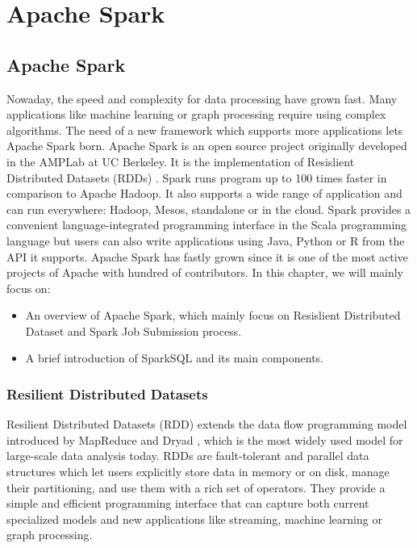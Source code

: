 
\chapter{Apache Spark} %

\label{Chapter2} %



\section{Apache Spark}
Nowaday, the speed and complexity for data processing have grown fast. Many applications like machine learning or graph processing require using complex algorithms. The need of a new framework which supports more applications lets Apache Spark born. Apache Spark is an open source project originally developed in the AMPLab at UC Berkeley. It is the implementation of Resislient Distributed Datasets (RDDs) \cite{matei}. Spark runs program up to 100 times faster in comparison to Apache Hadoop. It also supports a wide range of application and can run everywhere: Hadoop, Mesos, standalone or in the cloud. Spark provides a convenient language-integrated programming interface in the Scala programming language but users can also write applications using Java, Python or R from the API it supports. Apache Spark has fastly grown since it is one of the most active projects of Apache with hundred of contributors. In this chapter, we will mainly focus on:
\begin{itemize}
\item An overview of Apache Spark, which mainly focus on Resislient Distributed Dataset and Spark Job Submission process.
\item A brief introduction of SparkSQL and its main components.
\end{itemize}


\subsection{Resilient Distributed Datasets}
Resilient Distributed Datasets (RDD) extends the data flow programming model introduced by MapReduce \cite{Dean2004} and Dryad \cite{michael2007}, which is the most widely used model for large-scale data analysis today. RDDs are fault-tolerant and parallel data structures which let users explicitly store data in memory or on disk, manage their partitioning, and use them with a rich set of operators. They provide a simple and efficient programming interface that can capture both current specialized models and new applications like streaming, machine learning or graph processing.\\

